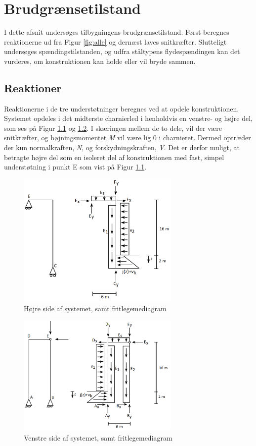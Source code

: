\chapter{Brudgrænsetilstand}
I dette afsnit undersøges tilbygningens brudgrænsetilstand. Først beregnes reaktionerne ud fra Figur \ref{fig:alle} og dernæst laves snitkræfter. Slutteligt undersøges spændingstilstanden, og udfra ståltypens flydespændingen kan det vurderes, om konstruktionen kan holde eller vil bryde sammen.   

\section{Reaktioner}
Reaktionerne i de tre understøtninger beregnes ved at opdele konstruktionen. Systemet opdeles i det midterste charnierled i henholdvis en venstre- og højre del, som ses på Figur \ref{fig:opdelingh} og \ref{fig:opdelingv}. I skæringen mellem de to dele, vil der være snitkræfter, og bøjningsmomentet \textit{M} vil være lig 0 i charnieret. Dermed optræder der kun normalkraften, \textit{N}, og forskydningskraften, \textit{V}. Det er derfor muligt, at betragte højre del som en isoleret del af konstruktionen med fast, simpel understøtning i punkt E som vist på Figur \ref{fig:opdelingh}.

\begin{figure}[H]
	\centering
	\includegraphics[width=0.7\textwidth]{billeder/hojre.png}
	\caption{Højre side af systemet, samt fritlegemediagram}
	\label{fig:opdelingh}
\end{figure}

\begin{figure}[H]
	\centering
	\includegraphics[width=0.7\textwidth]{billeder/venstre.png}
	\caption{Venstre side af systemet, samt fritlegemediagram}
	\label{fig:opdelingv}
\end{figure}

